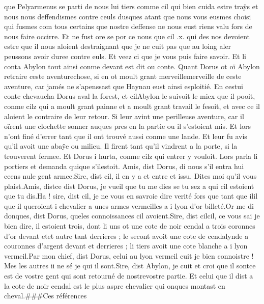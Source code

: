 \documentclass{article}
\begin{document}
\begin{pages}
      que Pelyarmenus se parti de nous lui tiers comme cil qui bien cuida estre traÿs et nous nous deffendismes contre ceuls 
      dusques atant que nous vous eusmes choisi qui fusmes com tous certains que nostre deffense ne nous eust riens valu fors de nous
      faire occirre. Et ne fust ore se por ce nous que cil .x. qui des nos devoient estre que il nous aloient destraignant
      que je ne cuit pas que au loing aler peussons avoir duree contre euls. Et veez ci que je vous puis faire savoir.
   Et li conta Abylon tout ainsi conme devant est dit 
      ou conte. \pend
\pstart Quant Dorus ot oï 
   Abylon 
   retraire ceste aventurechose, si 
   en ot moult grant 
   merveillemerveille de ceste aventure, 
   car jamés ne s’apenssast que Haynau eust ainsi esploitié. En cestui conte chevaucha 
   Dorus aval la forest, et cilAbylon le 
   suivoit le miex que il pooit, conme cilz qui a moult grant painne et a moult grant travail le fesoit, et avec ce il aloient le 
   contraire de leur retour. Si leur avint une perilleuse aventure, car il oïrent une clochette sonner auques 
   pres en la partie ou il s’estoient mis. 
   Et lors n’ont finé d’errer tant que il ont trouvé aussi conme une lande. Et leur fu avis qu’il avoit une 
   abaÿe ou milieu.  Il firent tant qu’il vindrent a la porte, si la trouverent fermee. 
   Et Dorus i hurta, conme cilz qui entrer y vouloit. Lors parla 
   li portiers et demanda 
   quique s’ilestoit.
   Amis, dist Dorus, di nous s’il entra hui ceens nule gent armee.Sire, dist cil, il en y a et entre et issu. Dites moi qu’il vous plaist.Amis, distce dist 
      Dorus, je vueil que tu me dies se tu sez a qui cil estoient que tu dis.Ha ! sire, dist cil, je ne 
      vous en savroie dire verité fors que tant 
      que ilil que il queroient i chevalier a unes armes vermeilles a i lyon d’or billeté.Or me di donques, dist Dorus, queles connoissances cil avoient.Sire, dist cilcil, ce vous sai je bien dire, 
      il estoient trois, dont li uns ot une cote de noir cendal a trois coronnes d’or devant 
      etet autre tant derrieres ; le secont avoit une cote de cendalynde 
      a couronnes d’argent devant et derrieres ; li tiers avoit une cote blanche a i lyon vermeil.Par mon chief, dist Dorus, celui au lyon vermeil cuit je bien 
      connoistre ! 
   Mes les autres ii ne sé je qui il sont.Sire, dist Abylon, je cuit et croi que 
      il sontce est de vostre gent qui sont retourné de 
      nostrevostre partie. Et celui que il dist a la cote de noir 
      cendal est le plus aspre chevalier qui onques montast en cheval.###Ces références 

\end{pages}
\end{document}
